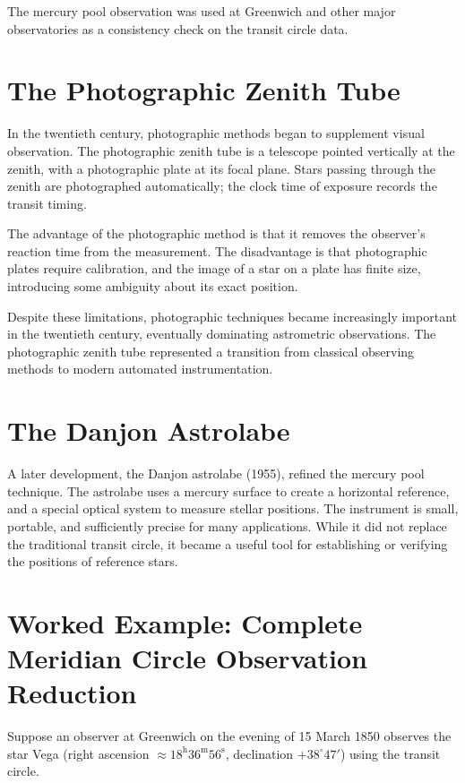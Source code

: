 The mercury pool observation was used at Greenwich and other major observatories as a consistency check on the transit circle data.

\section{The Photographic Zenith Tube}

In the twentieth century, photographic methods began to supplement visual observation. The photographic zenith tube is a telescope pointed vertically at the zenith, with a photographic plate at its focal plane. Stars passing through the zenith are photographed automatically; the clock time of exposure records the transit timing.

The advantage of the photographic method is that it removes the observer's reaction time from the measurement. The disadvantage is that photographic plates require calibration, and the image of a star on a plate has finite size, introducing some ambiguity about its exact position.

Despite these limitations, photographic techniques became increasingly important in the twentieth century, eventually dominating astrometric observations. The photographic zenith tube represented a transition from classical observing methods to modern automated instrumentation.

\section{The Danjon Astrolabe}

A later development, the Danjon astrolabe (1955), refined the mercury pool technique. The astrolabe uses a mercury surface to create a horizontal reference, and a special optical system to measure stellar positions. The instrument is small, portable, and sufficiently precise for many applications. While it did not replace the traditional transit circle, it became a useful tool for establishing or verifying the positions of reference stars.

\section{Worked Example: Complete Meridian Circle Observation Reduction}

Suppose an observer at Greenwich on the evening of 15 March 1850 observes the star Vega (right ascension $\approx 18^{\mathrm{h}}36^{\mathrm{m}}56^{\mathrm{s}}$, declination $+38^{\circ}47'$) using the transit circle.

